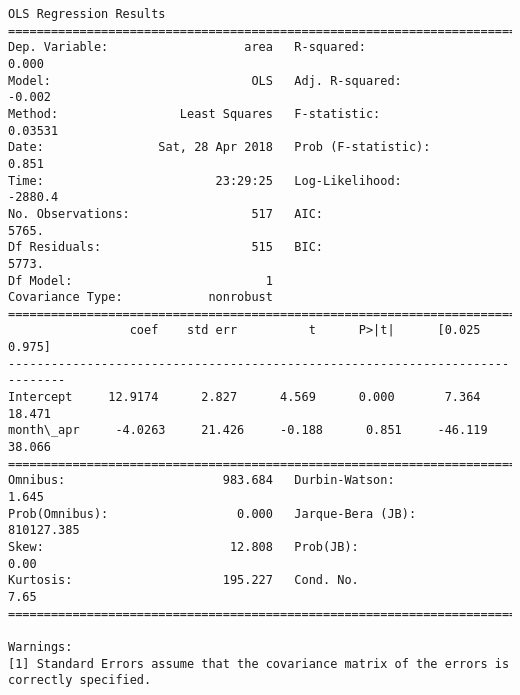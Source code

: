 \documentclass[11pt]{article}
\begin{document}
\begin{Verbatim}[commandchars=\\\{\}]
                            OLS Regression Results                            
==============================================================================
Dep. Variable:                   area   R-squared:                       0.000
Model:                            OLS   Adj. R-squared:                 -0.002
Method:                 Least Squares   F-statistic:                   0.03531
Date:                Sat, 28 Apr 2018   Prob (F-statistic):              0.851
Time:                        23:29:25   Log-Likelihood:                -2880.4
No. Observations:                 517   AIC:                             5765.
Df Residuals:                     515   BIC:                             5773.
Df Model:                           1                                         
Covariance Type:            nonrobust                                         
==============================================================================
                 coef    std err          t      P>|t|      [0.025      0.975]
------------------------------------------------------------------------------
Intercept     12.9174      2.827      4.569      0.000       7.364      18.471
month\_apr     -4.0263     21.426     -0.188      0.851     -46.119      38.066
==============================================================================
Omnibus:                      983.684   Durbin-Watson:                   1.645
Prob(Omnibus):                  0.000   Jarque-Bera (JB):           810127.385
Skew:                          12.808   Prob(JB):                         0.00
Kurtosis:                     195.227   Cond. No.                         7.65
==============================================================================

Warnings:
[1] Standard Errors assume that the covariance matrix of the errors is correctly specified.



\end{Verbatim}
\end{document}
